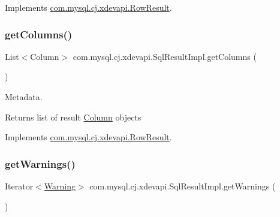 Implements \mbox{\hyperlink{interfacecom_1_1mysql_1_1cj_1_1xdevapi_1_1_row_result_acbc412c859e4618f3b924c602a82f541}{com.\+mysql.\+cj.\+xdevapi.\+Row\+Result}}.

\mbox{\label{classcom_1_1mysql_1_1cj_1_1xdevapi_1_1_sql_result_impl_a284f0953dcca6644eb9eff7749e32f9b}} 
\subsubsection{\texorpdfstring{get\+Columns()}{getColumns()}}
{\footnotesize\ttfamily List$<$Column$>$ com.\+mysql.\+cj.\+xdevapi.\+Sql\+Result\+Impl.\+get\+Columns (\begin{DoxyParamCaption}{ }\end{DoxyParamCaption})}

Metadata.

\begin{DoxyReturn}{Returns}
list of result \mbox{\hyperlink{interfacecom_1_1mysql_1_1cj_1_1xdevapi_1_1_column}{Column}} objects 
\end{DoxyReturn}


Implements \mbox{\hyperlink{interfacecom_1_1mysql_1_1cj_1_1xdevapi_1_1_row_result_a4bd495dadd5549516c0f32366f8d77c7}{com.\+mysql.\+cj.\+xdevapi.\+Row\+Result}}.

\mbox{\label{classcom_1_1mysql_1_1cj_1_1xdevapi_1_1_sql_result_impl_a58d7c6a9ad8d87b5447c2d2f5849ee73}} 
\subsubsection{\texorpdfstring{get\+Warnings()}{getWarnings()}}
{\footnotesize\ttfamily Iterator$<$\mbox{\hyperlink{interfacecom_1_1mysql_1_1cj_1_1protocol_1_1_warning}{Warning}}$>$ com.\+mysql.\+cj.\+xdevapi.\+Sql\+Result\+Impl.\+get\+Warnings (\begin{DoxyParamCaption}{ }\end{DoxyParamCaption})}

